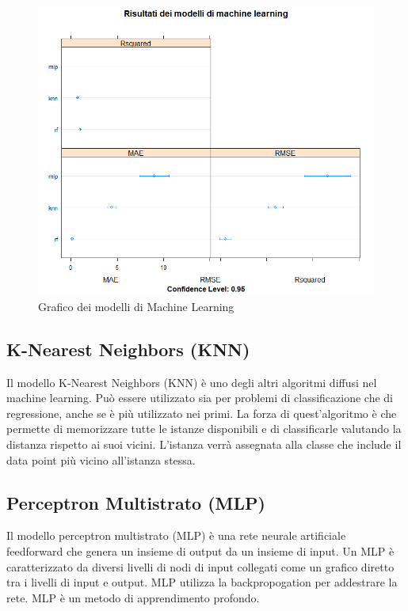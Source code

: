 \documentclass{article}
\begin{document}
\begin{figure}[h]
	\centering
	\includegraphics[width=1\textwidth]{modelli ml}
	\caption{Grafico dei modelli di Machine Learning}
	\label {fig:ds1}
\end{figure}

\subsection {K-Nearest Neighbors (KNN) } 
Il modello K-Nearest Neighbors (KNN) è uno degli altri algoritmi diffusi nel machine learning. Può essere utilizzato sia per problemi di classificazione che di regressione, anche se è più utilizzato nei primi. La forza di quest’algoritmo è che permette di memorizzare tutte le istanze disponibili e di classificarle valutando la distanza rispetto ai suoi vicini. L’istanza verrà assegnata alla classe che include il data point più vicino all’istanza stessa. 
\subsection {Perceptron Multistrato (MLP) }
Il modello perceptron multistrato (MLP) è una rete neurale artificiale feedforward che genera un insieme di output da un insieme di input. Un MLP è caratterizzato da diversi livelli di nodi di input collegati come un grafico diretto tra i livelli di input e output. MLP utilizza la backpropogation per addestrare la rete. MLP è un metodo di apprendimento profondo.
\end{document}
